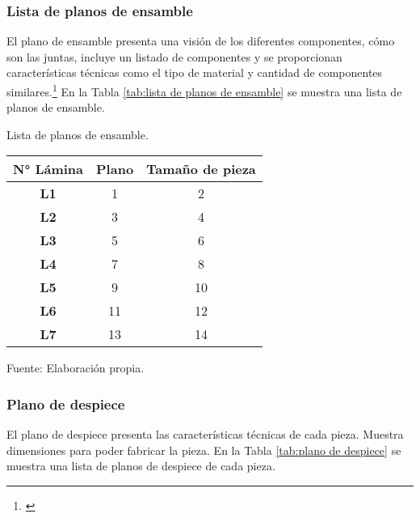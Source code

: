 \subsubsection{Lista de planos de ensamble}

El plano de ensamble presenta una visión de los diferentes componentes, cómo son las juntas, incluye un listado de componentes y se proporcionan características técnicas como el  tipo de material y cantidad de componentes similares.\footnote{\cite{Goetsch2010}} En la Tabla \ref{tab:lista de planos de ensamble} se muestra una lista de planos de ensamble.


\begin{mytable}[H]
	\centering
	\caption{Lista de planos de ensamble.}
	\label{tab:lista de planos de ensamble}
	\begin{tabular}{|c|c|c|}
		\hline
		\textbf{N° Lámina} & \textbf{Plano} & \textbf{Tamaño de pieza} \\ \hline
		\textbf{L1}        & 1              & 2             \\ \hline
		\textbf{L2}        & 3              & 4             \\ \hline
		\textbf{L3}        & 5              & 6             \\ \hline
		\textbf{L4}        & 7              & 8             \\ \hline
		\textbf{L5}        & 9              & 10            \\ \hline
		\textbf{L6}        & 11             & 12            \\ \hline
		\textbf{L7}        & 13             & 14            \\ \hline
	\end{tabular}
	\begin{flushleft}	
	Fuente: Elaboración propia.
\end{flushleft}
\end{mytable}


\subsubsection{Plano de despiece}

El plano de despiece presenta las características técnicas de cada pieza. Muestra dimensiones para poder fabricar la pieza. En la Tabla \ref{tab:plano de despiece} se muestra una lista de planos de despiece de cada pieza.

